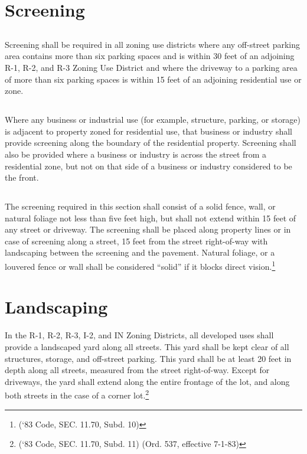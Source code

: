 \section{Screening}
\subsection{}
Screening shall be required in all zoning use districts where any off-street parking area contains more than six parking spaces and is within 30 feet of an adjoining R-1, R-2, and R-3 Zoning Use District and where the driveway to a parking area of more than six parking spaces is within 15 feet of an adjoining residential use or zone.
\subsection{}
Where any business or industrial use (for example, structure, parking, or storage) is adjacent to property zoned for residential use, that business or industry shall provide screening along the boundary of the residential property. Screening shall also be provided where a business or industry is across the street from a residential zone, but not on that side of a business or industry considered to be the front.
\subsection{}
The screening required in this section shall consist of a solid fence, wall, or natural foliage not less than five feet high, but shall not extend within 15 feet of any street or driveway. The screening shall be placed along property lines or in case of screening along a street, 15 feet from the street right-of-way with landscaping between the screening and the pavement. Natural foliage, or a louvered fence or wall shall be considered “solid” if it blocks direct vision.\footnote{(‘83 Code, SEC. 11.70, Subd. 10)}

\section{Landscaping}
In the R-1, R-2, R-3, I-2, and IN Zoning Districts, all developed uses shall provide a landscaped yard along all streets.  This yard shall be kept clear of all structures, storage, and off-street parking.  This yard shall be at least 20 feet in depth along all streets, measured from the street right-of-way.  Except for driveways, the yard shall extend along the entire frontage of the lot, and along both streets in the case of a corner lot.\footnote{(‘83 Code, SEC. 11.70, Subd. 11)  (Ord. 537, effective 7-1-83)}

